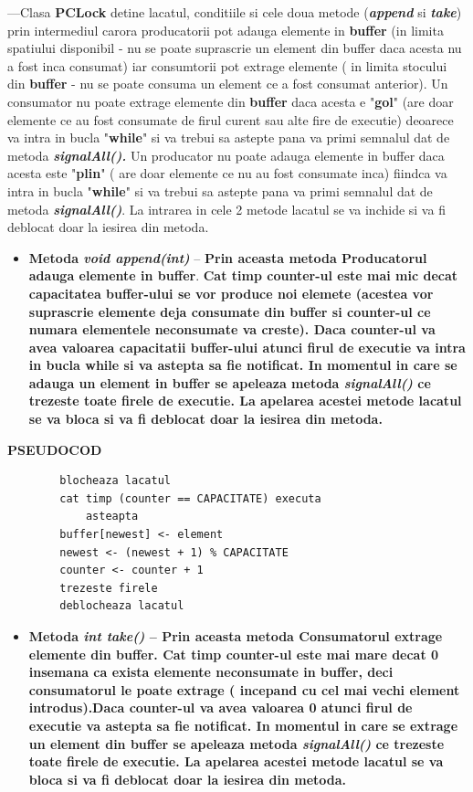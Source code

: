 \documentclass[14pt]{article}
\begin{document}
---Clasa \textbf{PCLock} detine lacatul, conditiile si cele doua metode (\textbf{\textit{append}} si \textbf{\textit{take}}) prin intermediul carora producatorii pot adauga elemente in \textbf{buffer} (in limita spatiului disponibil - nu se poate suprascrie  un element din buffer daca acesta nu a fost inca consumat) iar consumtorii pot extrage elemente ( in limita stocului din \textbf{buffer} - nu se poate consuma un element ce a fost consumat anterior). Un consumator nu poate extrage elemente din \textbf{buffer} daca acesta e "\textbf{gol}" (are doar elemente ce au fost consumate de firul curent sau alte fire de executie) deoarece va intra in bucla "\textbf{while}" si va trebui sa astepte pana va primi semnalul dat de metoda \textbf{\textit{signalAll().}} Un producator nu poate adauga elemente in buffer daca acesta este "\textbf{plin}" ( are doar elemente ce nu au fost consumate inca) fiindca va intra in bucla "\textbf{while}" si va trebui sa astepte pana va primi semnalul dat de metoda\textbf{\textit{ signalAll()}}. La intrarea in cele 2 metode lacatul se va inchide si va fi deblocat doar la iesirea din metoda.


\begin{itemize}
\item \textbf{Metoda \textit{void append(int)}} -- \textbf{Prin aceasta metoda Producatorul adauga elemente in buffer}. \textbf{Cat timp counter-ul este mai mic decat capacitatea buffer-ului se vor produce noi elemete (acestea vor suprascrie elemente deja consumate din buffer si counter-ul ce numara elementele neconsumate va creste). Daca counter-ul va avea valoarea capacitatii buffer-ului atunci firul de executie va intra in bucla while si va astepta sa fie notificat. In momentul in care se adauga un element in buffer se apeleaza metoda \textit{signalAll()} ce trezeste toate firele de executie. La apelarea acestei metode lacatul se va bloca si va fi deblocat doar la iesirea din metoda.}
\end{itemize}

 \textbf{PSEUDOCOD}
 \begin{lstlisting}
		blocheaza lacatul
		cat timp (counter == CAPACITATE) executa
			asteapta
		buffer[newest] <- element
		newest <- (newest + 1) % CAPACITATE
		counter <- counter + 1
		trezeste firele
		deblocheaza lacatul
\end{lstlisting}

\begin{itemize}
\item \textbf{Metoda\textit{ int take()} -- Prin aceasta metoda Consumatorul extrage elemente din buffer. Cat timp counter-ul este mai mare decat 0 insemana ca exista elemente neconsumate in buffer, deci consumatorul le poate extrage ( incepand cu cel mai vechi element introdus).Daca counter-ul va avea valoarea 0 atunci firul de executie va astepta sa fie notificat. In momentul in care se extrage un element din buffer se apeleaza metoda \textit{signalAll()} ce trezeste toate firele de executie. La apelarea acestei metode lacatul se va bloca si va fi deblocat doar la iesirea din metoda.}
\end{itemize}
\end{document}
